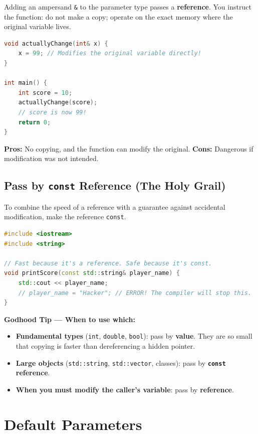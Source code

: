 Adding an ampersand \texttt{\&} to the parameter type passes a \textbf{reference}. You instruct the function: do not make a copy; operate on the exact memory where the original variable lives.

\begin{lstlisting}[language=C++, caption={Pass by reference modifies the original}]
void actuallyChange(int& x) {
    x = 99; // Modifies the original variable directly!
}

int main() {
    int score = 10;
    actuallyChange(score);
    // score is now 99!
    return 0;
}
\end{lstlisting}

\textbf{Pros:} No copying, and the function can modify the original. \textbf{Cons:} Dangerous if modification was not intended.

\subsection{Pass by \texttt{const} Reference (The Holy Grail)}

To combine the speed of a reference with a guarantee against accidental modification, make the reference \texttt{const}.

\begin{lstlisting}[language=C++, caption={const reference --- fast and safe}]
#include <iostream>
#include <string>

// Fast because it's a reference. Safe because it's const.
void printScore(const std::string& player_name) {
    std::cout << player_name;
    // player_name = "Hacker"; // ERROR! The compiler will stop this.
}
\end{lstlisting}

\textbf{Godhood Tip --- When to use which:}
\begin{itemize}
    \item \textbf{Fundamental types} (\texttt{int}, \texttt{double}, \texttt{bool}): pass by \textbf{value}. They are so small that copying is faster than dereferencing a hidden pointer.
    \item \textbf{Large objects} (\texttt{std::string}, \texttt{std::vector}, classes): pass by \textbf{\texttt{const} reference}.
    \item \textbf{When you must modify the caller's variable}: pass by \textbf{reference}.
\end{itemize}

\section{Default Parameters}
\label{sec:default-parameters}

